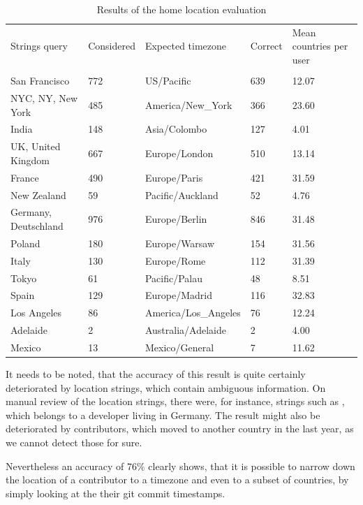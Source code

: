 \begin{table}[]
    \centering
    \begin{tabular}{lllll}
        Strings query        & Considered & Expected timezone    & Correct & Mean countries per user \\
        & & & & \\
        San Francisco        & 772        & US/Pacific           & 639     & 12.07  \\
        NYC, NY, New York    & 485        & America/New\_York    & 366     & 23.60  \\
        India                & 148        & Asia/Colombo         & 127     & 4.01   \\
        UK, United Kingdom   & 667        & Europe/London        & 510     & 13.14  \\
        France               & 490        & Europe/Paris         & 421     & 31.59  \\
        New Zealand          & 59         & Pacific/Auckland     & 52      & 4.76   \\
        Germany, Deutschland & 976        & Europe/Berlin        & 846     & 31.48  \\
        Poland               & 180        & Europe/Warsaw        & 154     & 31.56  \\
        Italy                & 130        & Europe/Rome          & 112     & 31.39  \\
        Tokyo                & 61         & Pacific/Palau        & 48      & 8.51   \\
        Spain                & 129        & Europe/Madrid        & 116     & 32.83  \\
        Los Angeles          & 86         & America/Los\_Angeles & 76      & 12.24  \\
        Adelaide             & 2          & Australia/Adelaide   & 2       & 4.00   \\
        Mexico               & 13         & Mexico/General       & 7       & 11.62
    \end{tabular}
    \caption{Results of the home location evaluation}\label{home-location-table}
\end{table}

It needs to be noted, that the accuracy of this result is quite certainly deteriorated by location strings, which contain ambiguous information.
On manual review of the location strings, there were, for instance, strings such as , which belongs to a developer living in Germany.
The result might also be deteriorated by contributors, which moved to another country in the last year, as we cannot detect those for sure.

Nevertheless an accuracy of 76\% clearly shows, that it is possible to narrow down the location of a contributor to a timezone and even to a subset of countries, by simply looking at the their git commit timestamps.
